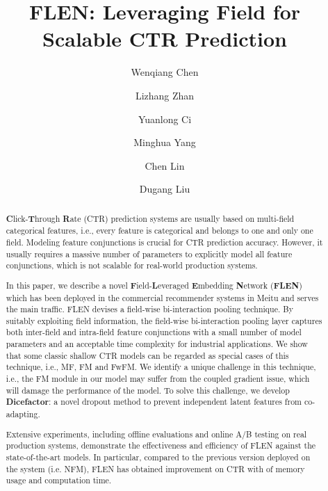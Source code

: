 \documentclass[sigconf]{acmart}
\begin{document}
\title{FLEN: Leveraging Field for Scalable CTR Prediction}



\author{Wenqiang Chen}

\author{Lizhang Zhan}

\author{Yuanlong Ci}

\author{Minghua Yang}

\author{Chen Lin}

\author{Dugang Liu}
\authornotemark[1]
\renewcommand{\shortauthors}{Chen et al.}

\begin{abstract}
\textbf{C}lick-\textbf{T}hrough \textbf{R}ate (CTR) prediction systems are usually based on multi-field categorical features, i.e., every feature is categorical and belongs to one and only one field. Modeling feature conjunctions is crucial for CTR prediction accuracy. 
However, it usually requires a massive number of parameters to explicitly model all feature conjunctions, which is not scalable for real-world production systems. 

In this paper, we describe a novel \textbf{F}ield-\textbf{L}everaged \textbf{E}mbedding \textbf{N}etwork (\textbf{FLEN}) which has been deployed in the commercial recommender systems in Meitu and serves the main traffic. FLEN devises a field-wise bi-interaction pooling technique.
By suitably exploiting field information, the field-wise bi-interaction pooling layer captures both inter-field and intra-field feature conjunctions with a small number of model parameters and an acceptable time complexity for industrial applications.  
We show that some classic shallow CTR models can be regarded as special cases of this technique, i.e., MF, FM and FwFM.  
We identify a unique challenge in this technique, i.e., the FM module in our model may suffer from the coupled gradient issue, which will damage the performance of the model.
To solve this challenge, we develop \textbf{Dicefactor}: a novel dropout method to prevent independent latent features from co-adapting. 

Extensive experiments, including offline evaluations and online A/B testing on real production systems, demonstrate the effectiveness and efficiency of FLEN against the state-of-the-art models. In particular, compared to the previous version deployed on the system (i.e. NFM), FLEN has obtained  improvement on CTR with  of memory usage and computation time. 
\end{abstract}
\end{document}
